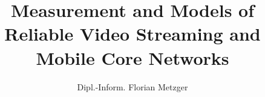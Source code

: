 
\title{Measurement and Models of Reliable Video Streaming and Mobile Core Networks}
\author{Dipl.-Inform. Florian Metzger}
\newcommand{\betreuer}{Univ.-Prof.~Dipl.-Ing.~Dr.~Helmut Hlavacs}
\newcommand{\gutachterA}{Univ.-Prof.~Dipl.-Math.~Dr.~Peter Reichl,~M.A.~St.}
\newcommand{\gutachterB}{Prof.~Dr.-Ing.~Phuoc Tran-Gia}

\newcommand{\dissertationsgebiet}{Informatik}
\newcommand{\studienkennzahl}{A 786 880}
\newcommand{\akademischergrad}{Doktor der technischen Wissenschaften (Dr. tech.)}